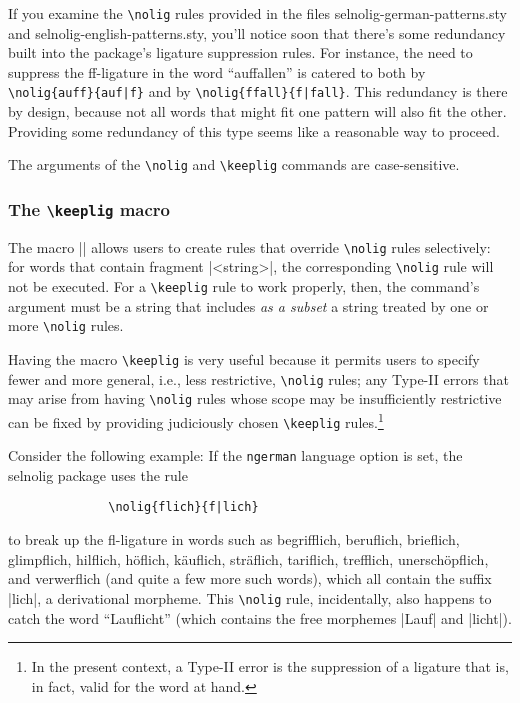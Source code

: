 \documentclass[11pt]{article}
\newcommand{\pkg}[1]{\textsf{#1}}
\newcommand{\opt}[1]{\texttt{#1}}
\newcommand{\cmmd}[1]{\texttt{\textbackslash #1}}
\begin{document}
If you examine the \cmmd{nolig} rules provided in the files \pkg{selnolig-german-patterns.sty} and \pkg{selnolig-english-patterns.sty}, you'll notice soon that there's some redundancy built into the package's ligature suppression rules. For instance, the need to suppress the ff-ligature in the word \enquote{auffallen} is catered to both by \Verb+\nolig{auff}{auf|f}+ and by \Verb+\nolig{ffall}{f|fall}+. This redundancy is there by design, because not all words that might fit one pattern will also fit the other. Providing some redundancy of this type seems like a reasonable way to proceed.

The arguments of the \cmmd{nolig} and \cmmd{keeplig} commands are case-sensitive. 

\subsubsection{The \cmmd{keeplig} macro} 
\label{sec:keeplig}


The macro || allows users to create rules that override \cmmd{nolig} rules selectively: for words that contain fragment |<string>|, the corresponding \cmmd{nolig} rule will not be executed. For a \cmmd{keeplig} rule to work properly, then, the command's argument must be a string that includes \emph{as a subset} a string treated by one or more \cmmd{nolig} rules.

Having the macro \cmmd{keeplig} is very useful because it permits users to specify fewer and more general, i.e., less restrictive, \cmmd{nolig} rules; any Type-II errors that may arise from having \cmmd{nolig} rules whose scope may be insufficiently restrictive can be fixed by providing judiciously chosen \cmmd{keeplig} rules.\footnote{In the present context, a Type-II error is the suppression of a ligature that is, in fact, valid for the word at hand.}

Consider the following example: If the \opt{ngerman} language option is set, the \pkg{selnolig} package uses the rule 
\begin{Verbatim}
              \nolig{flich}{f|lich}
\end{Verbatim}
to break up the fl-ligature in words such as begrifflich, beruflich, brieflich, glimpflich, hilflich, höflich, käuflich, s\breaklig träflich, tariflich, trefflich, unerschöpflich, and verwerflich (and quite a few more such words), which all contain the suffix |lich|, a derivational morpheme. This \cmmd{nolig} rule, incidentally, also happens to catch the word \enquote{Lauflicht} (which contains the free morphemes |Lauf| and |licht|). 
\end{document}
